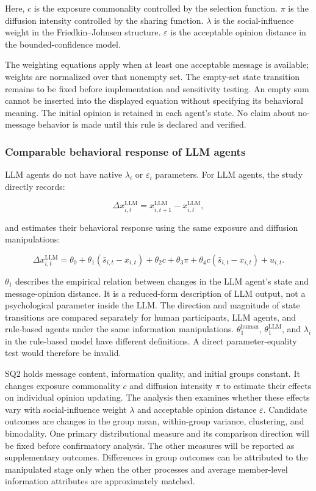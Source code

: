 \documentclass[11pt,a4paper]{article}
\begin{document}
Here, $c$ is the exposure commonality controlled by the selection function. $\pi$ is the diffusion intensity controlled by the sharing function. $\lambda$ is the social-influence weight in the Friedkin--Johnsen structure. $\varepsilon$ is the acceptable opinion distance in the bounded-confidence model.

The weighting equations apply when at least one acceptable message is available; weights are normalized over that nonempty set. The empty-set state transition remains to be fixed before implementation and sensitivity testing. An empty sum cannot be inserted into the displayed equation without specifying its behavioral meaning. The initial opinion is retained in each agent's state. No claim about no-message behavior is made until this rule is declared and verified.

\subsubsection{Comparable behavioral response of LLM agents}

LLM agents do not have native $\lambda_i$ or $\varepsilon_i$ parameters. For LLM agents, the study directly records:

\begin{equation*}
\Delta x^{\text{LLM}}_{i,t}
=
x^{\text{LLM}}_{i,t+1}
-
x^{\text{LLM}}_{i,t},
\end{equation*}

and estimates their behavioral response using the same exposure and diffusion manipulations:

\begin{equation*}
\Delta x^{\text{LLM}}_{i,t}
=
\theta_0
+
\theta_1(\bar s_{i,t}-x_{i,t})
+
\theta_2c
+
\theta_3\pi
+
\theta_4c(\bar s_{i,t}-x_{i,t})
+
u_{i,t}.
\end{equation*}

$\theta_1$ describes the empirical relation between changes in the LLM agent's state and message-opinion distance. It is a reduced-form description of LLM output, not a psychological parameter inside the LLM. The direction and magnitude of state transitions are compared separately for human participants, LLM agents, and rule-based agents under the same information manipulations. $\theta_1^{\text{human}}$, $\theta_1^{\text{LLM}}$, and $\lambda_i$ in the rule-based model have different definitions. A direct parameter-equality test would therefore be invalid.

SQ2 holds message content, information quality, and initial groups constant. It changes exposure commonality $c$ and diffusion intensity $\pi$ to estimate their effects on individual opinion updating. The analysis then examines whether these effects vary with social-influence weight $\lambda$ and acceptable opinion distance $\varepsilon$. Candidate outcomes are changes in the group mean, within-group variance, clustering, and bimodality. One primary distributional measure and its comparison direction will be fixed before confirmatory analysis. The other measures will be reported as supplementary outcomes. Differences in group outcomes can be attributed to the manipulated stage only when the other processes and average member-level information attributes are approximately matched.
\end{document}
